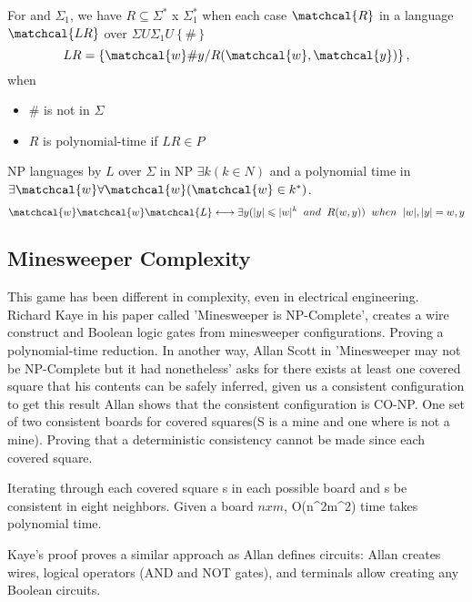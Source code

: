 \documentclass[a4paper]{article}
\numberwithin{equation}{subsection}
\begin{document}
For \Sigman and $\Sigma_1$, we have $R \subseteq \Sigma^*$ x $\Sigma^*_1$ when each case $\matchcal{R}$ in a language $\matchcal{LR}$ over $\Sigma U \Sigma_1 U \left \{\#\right \}$
\begin{equation}
LR = \left \{ \matchcal{w} \# y / R(\matchcal{w},\matchcal{y})\right\},
\end{equation}
when 
\begin{itemize}
  \item \# is not in $\Sigma$
  \item $R$ is polynomial-time if $LR \in P$
\end{itemize}
NP languages by $L$ over $\Sigma$ in NP $\exists k(k \in N)$ and a polynomial time in  $ \exists\matchcal{w}\forall\matchcal{w}(\matchcal{w} \in k^* )$.
\begin{equation}
\matchcal{w}\matchcal{w}\matchcal{L} \longleftrightarrow \exists y (\lvert  y \rvert \leqslant \lvert w \rvert^k \hspace{2mm}and \hspace{2mm} R(w,y)) \hspace{2mm} when \hspace{2mm} \lvert w \rvert, \lvert y \rvert = w,y
\end{equation}


\subsection{Minesweeper Complexity}

This game has been different in complexity, even in electrical engineering. Richard Kaye in his paper called 'Minesweeper is NP-Complete', creates a wire construct and Boolean logic gates from minesweeper configurations. Proving a polynomial-time reduction. In another way, Allan Scott in 'Minesweeper may not be NP-Complete but it had nonetheless' asks for there exists at least one covered square that his contents can be safely inferred, given us a consistent configuration to get this result Allan shows that the consistent configuration is CO-NP. One set of two consistent boards for covered squares(S is a mine and one where is not a mine). Proving that a deterministic consistency cannot be made since each covered square.

Iterating through each covered square s in each possible board and s be consistent in eight neighbors. Given a board $n x m$, O(n^2m^2) time takes polynomial time.

Kaye's proof proves a similar approach as Allan defines circuits: Allan creates wires, logical operators (AND and NOT gates), and terminals allow creating any Boolean circuits.
\end{document}
